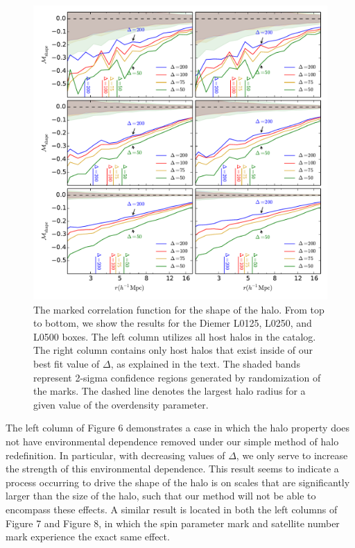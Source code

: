 \documentclass[usenatbib,usegraphicx,letterpaper]{mn2e}
\begin{document}
\begin{figure}
	\centering
	\includegraphics[width=\textwidth]{all_mcf_s_z00_hostsvmatch.pdf}
	\caption{The marked correlation function for the shape of the halo. From top to bottom, we show the results for the Diemer L0125, L0250, and L0500 boxes. The left column utilizes all host halos in the catalog. The right column contains only host halos that exist inside of our best fit value of $\Delta$, as explained in the text. The shaded bands represent 2-sigma confidence regions generated by randomization of the marks. The dashed line denotes the largest halo radius for a given value of the overdensity parameter.}
\end{figure}

The left column of Figure 6 demonstrates a case in which the halo property does not have environmental dependence removed under our simple method of halo redefinition. In particular, with decreasing values of $\Delta$, we only serve to increase the strength of this environmental dependence. This result seems to indicate a process occurring to drive the shape of the halo is on scales that are significantly larger than the size of the halo, such that our method will not be able to encompass these effects. A similar result is located in both the left columns of Figure 7 and Figure 8, in which the spin parameter mark and satellite number mark experience the exact same effect.
\end{document}
